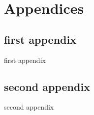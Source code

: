 \documentclass[a4paper]{report}
\begin{document}
\chapter*{Appendices}
\mtcaddchapter[Appendices]
\minitoc
\section*{first appendix}
%
  {first appendix}
\section*{second appendix}
%
  {second appendix}
\listoffigures \mtcaddchapter
\begin{thebibliography}{3}
\end{thebibliography}
\adjustmtc
\end{document}
